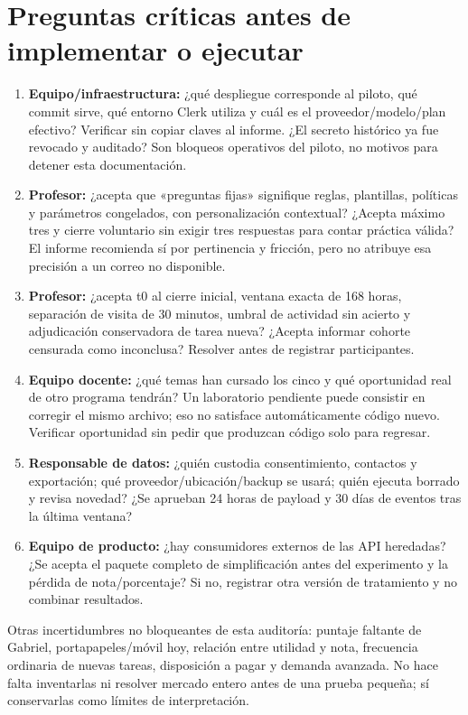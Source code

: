 \documentclass[11pt,a4paper]{report}
\begin{document}
\section{Preguntas críticas antes de implementar o ejecutar}
\begin{enumerate}
\item \textbf{Equipo/infraestructura:} ¿qué despliegue corresponde al piloto, qué commit sirve, qué entorno Clerk utiliza y cuál es el proveedor/modelo/plan efectivo? Verificar sin copiar claves al informe. ¿El secreto histórico ya fue revocado y auditado? Son bloqueos operativos del piloto, no motivos para detener esta documentación.
\item \textbf{Profesor:} ¿acepta que «preguntas fijas» signifique reglas, plantillas, políticas y parámetros congelados, con personalización contextual? ¿Acepta máximo tres y cierre voluntario sin exigir tres respuestas para contar práctica válida? El informe recomienda sí por pertinencia y fricción, pero no atribuye esa precisión a un correo no disponible.
\item \textbf{Profesor:} ¿acepta t0 al cierre inicial, ventana exacta de 168 horas, separación de visita de 30 minutos, umbral de actividad sin acierto y adjudicación conservadora de tarea nueva? ¿Acepta informar cohorte censurada como inconclusa? Resolver antes de registrar participantes.
\item \textbf{Equipo docente:} ¿qué temas han cursado los cinco y qué oportunidad real de otro programa tendrán? Un laboratorio pendiente puede consistir en corregir el mismo archivo; eso no satisface automáticamente código nuevo. Verificar oportunidad sin pedir que produzcan código solo para regresar.
\item \textbf{Responsable de datos:} ¿quién custodia consentimiento, contactos y exportación; qué proveedor/ubicación/backup se usará; quién ejecuta borrado y revisa novedad? ¿Se aprueban 24 horas de payload y 30 días de eventos tras la última ventana?
\item \textbf{Equipo de producto:} ¿hay consumidores externos de las API heredadas? ¿Se acepta el paquete completo de simplificación antes del experimento y la pérdida de nota/porcentaje? Si no, registrar otra versión de tratamiento y no combinar resultados.
\end{enumerate}
Otras incertidumbres no bloqueantes de esta auditoría: puntaje faltante de Gabriel, portapapeles/móvil hoy, relación entre utilidad y nota, frecuencia ordinaria de nuevas tareas, disposición a pagar y demanda avanzada. No hace falta inventarlas ni resolver mercado entero antes de una prueba pequeña; sí conservarlas como límites de interpretación.
\end{document}
